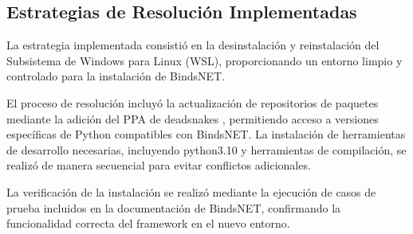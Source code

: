 \subsection{Estrategias de Resolución Implementadas}

La estrategia implementada consistió en la desinstalación y reinstalación del Subsistema de Windows para Linux (WSL), proporcionando un entorno limpio y controlado para la instalación de BindsNET.

El proceso de resolución incluyó la actualización de repositorios de paquetes mediante la adición del PPA de deadsnakes \cite{deadsnakes2025}, permitiendo acceso a versiones específicas de Python compatibles con BindsNET. La instalación de herramientas de desarrollo necesarias, incluyendo python3.10 y herramientas de compilación, se realizó de manera secuencial para evitar conflictos adicionales.

La verificación de la instalación se realizó mediante la ejecución de casos de prueba incluidos en la documentación de BindsNET, confirmando la funcionalidad correcta del framework en el nuevo entorno.